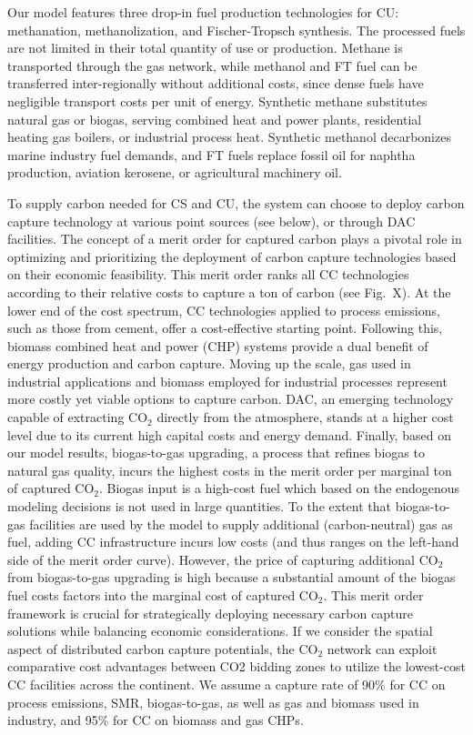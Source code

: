 \documentclass[twocolumn]{article}
\newcommand{\carbon}{CO$_2$}
\begin{document}
Our model features three drop-in fuel production technologies for CU: methanation, methanolization, and Fischer-Tropsch synthesis. The processed fuels are not limited in their total quantity of use or production. Methane is transported through the gas network, while methanol and FT fuel can be transferred inter-regionally without additional costs, since dense fuels have negligible transport costs per unit of energy. Synthetic methane substitutes natural gas or biogas, serving combined heat and power plants, residential heating gas boilers, or industrial process heat. Synthetic methanol decarbonizes marine industry fuel demands, and FT fuels replace fossil oil for naphtha production, aviation kerosene, or agricultural machinery oil.

To supply carbon needed for CS and CU, the system can choose to deploy carbon capture technology at various point sources (see below), or through DAC facilities. The concept of a merit order for captured carbon plays a pivotal role in optimizing and prioritizing the deployment of carbon capture technologies based on their economic feasibility. This merit order ranks all CC technologies according to their relative costs to capture a ton of carbon (see Fig.~X). At the lower end of the cost spectrum, CC technologies applied to process emissions, such as those from cement, offer a cost-effective starting point. Following this, biomass combined heat and power (CHP) systems provide a dual benefit of energy production and carbon capture. Moving up the scale, gas used in industrial applications and biomass employed for industrial processes represent more costly yet viable options to capture carbon. DAC, an emerging technology capable of extracting \carbon{} directly from the atmosphere, stands at a higher cost level due to its current high capital costs and energy demand. Finally, based on our model results, biogas-to-gas upgrading, a process that refines biogas to natural gas quality, incurs the highest costs in the merit order per marginal ton of captured \carbon{}. Biogas input is a high-cost fuel which based on the endogenous modeling decisions is not used in large quantities. To the extent that biogas-to-gas facilities are used by the model to supply additional (carbon-neutral) gas as fuel, adding CC infrastructure incurs low costs (and thus ranges on the left-hand side of the merit order curve). However, the price of capturing additional \carbon{} from biogas-to-gas upgrading is high because a substantial amount of the biogas fuel costs factors into the marginal cost of captured \carbon{}. This merit order framework is crucial for strategically deploying necessary carbon capture solutions while balancing economic considerations. If we consider the spatial aspect of distributed carbon capture potentials, the \carbon{} network can exploit comparative cost advantages between CO2 bidding zones to utilize the lowest-cost CC facilities across the continent. We assume a capture rate of 90\% for CC on process emissions, SMR, biogas-to-gas, as well as gas and biomass used in industry, and 95\% for CC on biomass and gas CHPs.
\end{document}
